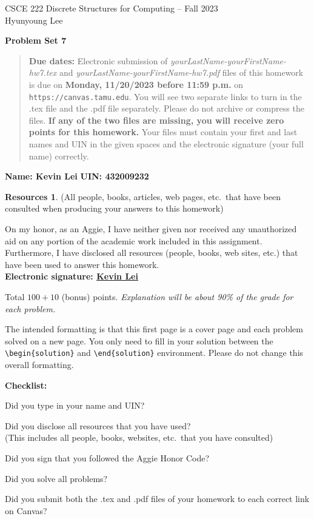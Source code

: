 \documentclass{article}
\theoremstyle{definition}
\newtheorem*{solution}{Solution}
\newtheorem*{resources}{Resources}
\newcommand{\name}[2]{\noindent\textbf{Name: #1}\hfill \textbf{UIN: #2}
  \newcommand{\myName}{#1}
  \newcommand{\myUIN}{#2}
}
\newcommand{\honor}{\noindent On my honor, as an Aggie, I have neither
  given nor received any unauthorized aid on any portion of the
  academic work included in this assignment. Furthermore, I have
  disclosed all resources (people, books, web sites, etc.) that have
  been used to answer this homework. \\[2ex]
 \textbf{Electronic signature: \underline{ Kevin Lei } } } %
\newcommand{\checklist}{\noindent\textbf{Checklist:}
\begin{compactitem}[$\Box$] 
\item Did you type in your name and UIN? 
\item Did you disclose all resources that you have used? \\
(This includes all people, books, websites, etc.\ that you have consulted)
\item Did you sign that you followed the Aggie Honor Code? 
\item Did you solve all problems? 
\item Did you submit both the .tex and .pdf files of your homework to each correct link 
on Canvas? 
\end{compactitem}
}
\newcommand{\problemset}[1]{\begin{center}\textbf{Problem Set #1}\end{center}}
\newcommand{\duedate}[1]{\begin{quote}\textbf{Due dates:} Electronic
    submission of \textsl{yourLastName-yourFirstName-hw7.tex} and 
    \textsl{yourLastName-yourFirstName-hw7.pdf} files of this homework is due on
    \textbf{#1} on \texttt{https://canvas.tamu.edu}. You will see two separate links
    to turn in the .tex file and the .pdf file separately. Please do not archive or compress the files.  
    \textbf{If any of the two files are missing, you will receive zero points for this homework.}
    Your files must contain your first and last names and UIN in the given spaces and 
    the electronic signature (your full name) correctly.\end{quote} }
\begin{document}
\begin{center}
{\large
CSCE 222 Discrete Structures for Computing -- Fall 2023\\[.5ex]
Hyunyoung Lee\\}
\end{center}
\problemset{7}
\duedate{Monday, 11/20/2023 before 11:59 p.m.}
\name{ Kevin Lei }{ 432009232 } %

\begin{resources} (All people, books, articles, web pages, etc.\ that
  have been consulted when producing your answers to this homework)
\end{resources}
\honor

\bigskip

\noindent
Total $100+10$ (bonus) points.  \textit{Explanation will be about 90\% of the grade 
for each problem.}

\bigskip

\noindent
The intended formatting is that this first page is a cover page and each 
problem solved on a new page. You only need to fill in your solution between 
the \verb|\begin{solution}| and \verb|\end{solution}| environment.  
Please do not change this overall formatting.

\vfill
\checklist
\end{document}
